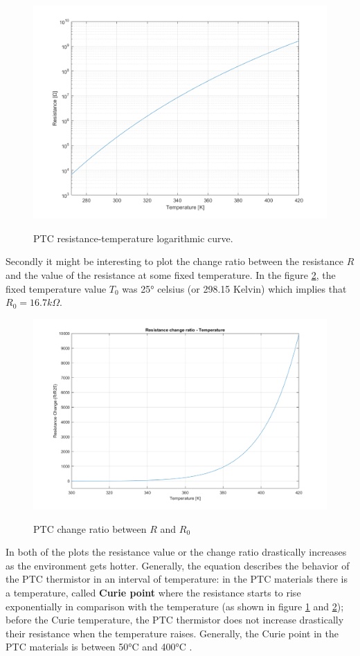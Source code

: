 \begin{figure}[h]
    \centering
    \includegraphics[width = .75\textwidth]{../res/plots/PTC_logarithmic.png}
    \label{fig:PTC_logarithmic}
    \caption{PTC resistance-temperature logarithmic curve.}
\end{figure}

\FloatBarrier\noindent Secondly it might be interesting to plot the change ratio between the resistance $R$ and the value of the resistance at some fixed temperature. In the figure \ref{fig:PTC_ratio}, the fixed temperature value $T_0$ was 25° celsius (or 298.15 Kelvin) which implies that $R_0 = 16.7 k\Omega$.

\begin{figure}[h]
    \centering
    \includegraphics[width = .75\textwidth]{../res/plots/PTC_ratio.png}
    \label{fig:PTC_ratio}
    \caption{PTC change ratio between $R$ and $R_0$}
\end{figure}

\FloatBarrier\noindent In both of the plots the resistance value or the change ratio drastically increases as the environment gets hotter. Generally, the equation describes the behavior of the PTC thermistor in an interval of temperature: in the PTC materials there is a temperature, called \textbf{Curie point} where the resistance starts to rise exponentially in comparison with the temperature (as shown in figure \ref{fig:PTC_logarithmic} and \ref{fig:PTC_ratio}); before the Curie temperature, the PTC thermistor does not increase drastically their resistance when the temperature raises. Generally, the Curie point in the PTC materials is between 50°C and 400°C \cite{Cheng2014441}.

